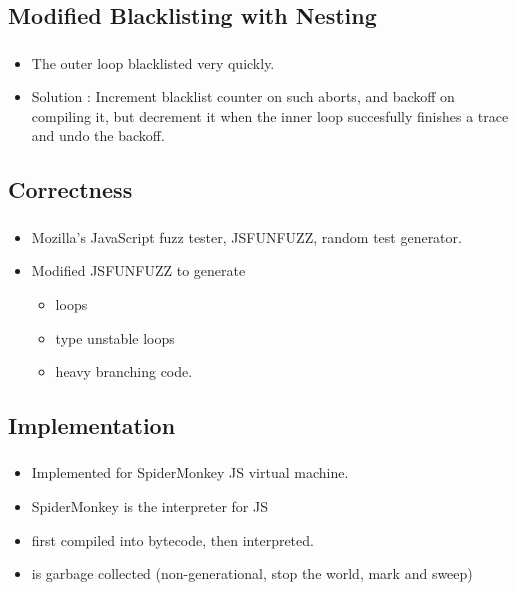 \documentclass[mathserif,10pt]{beamer}
\newcommand{\cmt}[1]{}
\begin{document}
\subsection{Modified Blacklisting with Nesting}
\frame
{
  \frametitle{\subsecname}
  \begin{itemize}
   \item  The outer loop blacklisted very quickly.
   \item Solution : 
     Increment blacklist counter on such aborts, and backoff on compiling it,  but decrement it when the inner loop succesfully finishes a trace and undo the backoff.
   \end{itemize}
}
               \cmt{ as the inner loop not available or takes side exit
   Solution : 
     Increment blacklist counter on such aborts, and backoff on compiling it,  but decrement it when the inner loop
     succesfully finishes a trace and undo the backoff.
               }

\subsection{Correctness}
\frame
{
  \frametitle{\subsecname}
  \begin{itemize}
    \item Mozilla’s JavaScript fuzz tester, JSFUNFUZZ, random test generator.
    \item Modified JSFUNFUZZ to generate
    \begin{itemize}
      \item loops
      \item type unstable loops
      \item heavy branching code.
    \end{itemize}
  \end{itemize}
}
\subsection{Implementation}
\frame
{
  \frametitle{\subsecname}
  \begin{itemize}
    \item Implemented for SpiderMonkey JS virtual machine.
    \item SpiderMonkey is the interpreter for JS
    \item first compiled into bytecode, then interpreted.
    \item is garbage collected (non-generational, stop the world, mark and sweep)
  \end{itemize}  
}
\end{document}
